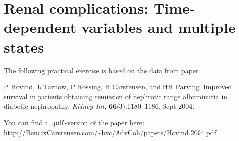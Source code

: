 
\renewcommand{\rwpre}{./graph/renal}
\section{Renal complications:%
\newline Time-dependent variables and multiple states}
The following practical exercise is based on the data from paper:
\begin{description}
\item
P Hovind, L Tarnow, P Rossing, B Carstensen, and HH Parving:
Improved survival in patients obtaining remission of nephrotic range
  albuminuria in diabetic nephropathy.
\textit{Kidney Int}, \textbf{66}(3):1180--1186, Sept 2004.
\end{description}
You can find a \texttt{.pdf}-version of the paper here:
\url{http://BendixCarstensen.com/~bxc/AdvCoh/papers/Hovind.2004.pdf}
